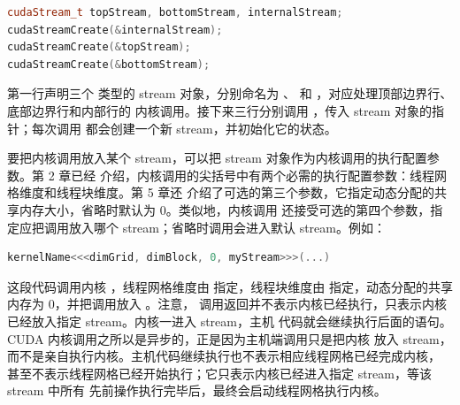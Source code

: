 \begin{lstlisting}[language=C++,numbers=none]
cudaStream_t topStream, bottomStream, internalStream;
cudaStreamCreate(&internalStream);
cudaStreamCreate(&topStream);
cudaStreamCreate(&bottomStream);
\end{lstlisting}

第一行声明三个  类型的 stream 对象，分别命名为 、
 和 ，对应处理顶部边界行、底部边界行和内部行的
内核调用。接下来三行分别调用 ，传入 stream 对象的指针；每次调用
都会创建一个新 stream，并初始化它的状态。

要把内核调用放入某个 stream，可以把 stream 对象作为内核调用的执行配置参数。第 2 章已经
介绍，内核调用的尖括号中有两个必需的执行配置参数：线程网格维度和线程块维度。第 5 章还
介绍了可选的第三个参数，它指定动态分配的共享内存大小，省略时默认为 0。类似地，内核调用
还接受可选的第四个参数，指定应把调用放入哪个 stream；省略时调用会进入默认 stream。例如：

\begin{lstlisting}[language=C++,numbers=none]
kernelName<<<dimGrid, dimBlock, 0, myStream>>>(...)
\end{lstlisting}

这段代码调用内核 ，线程网格维度由  指定，线程块维度由
 指定，动态分配的共享内存为 0，并把调用放入 。注意，
调用返回并不表示内核已经执行，只表示内核已经放入指定 stream。内核一进入 stream，主机
代码就会继续执行后面的语句。CUDA 内核调用之所以是异步的，正是因为主机端调用只是把内核
放入 stream，而不是亲自执行内核。主机代码继续执行也不表示相应线程网格已经完成内核，
甚至不表示线程网格已经开始执行；它只表示内核已经进入指定 stream，等该 stream 中所有
先前操作执行完毕后，最终会启动线程网格执行内核。

